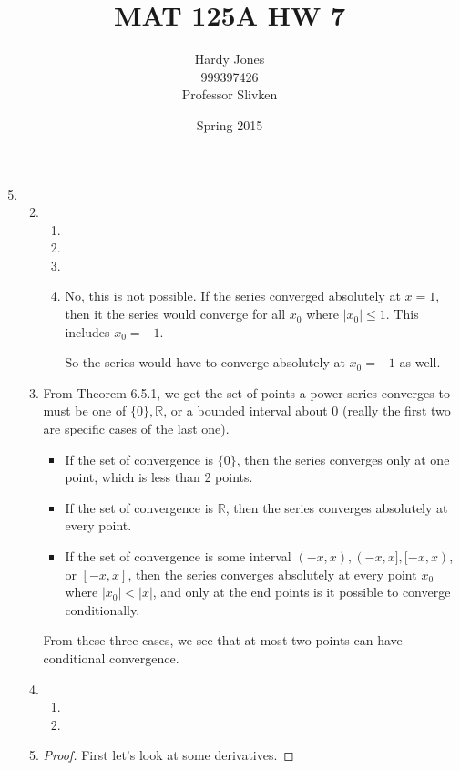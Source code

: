 \documentclass[12pt,letterpaper]{article}
\title{MAT 125A HW 7\vspace{-2ex}}
\author{Hardy Jones\\
        999397426\\
        Professor Slivken\vspace{-2ex}}
\date{Spring 2015}
\begin{document}
  \maketitle

  \begin{enumerate}
    \setcounter{enumi}{4}
    \item
      \begin{enumerate}
        \setcounter{enumii}{1}
        \item
          \begin{enumerate}
            \item
            \item
            \item
            \item
              No, this is not possible.
              If the series converged absolutely at $x = 1$,
              then it the series would converge for all $x_0$ where $|x_0| \leq 1$.
              This includes $x_0 = -1$.

              So the series would have to converge absolutely at $x_0 = -1$ as well.
          \end{enumerate}
        \item
          From Theorem 6.5.1, we get the set of points a power series converges to must be one of $\{0\}, \mathbb{R}$, or a bounded interval about 0 (really the first two are specific cases of the last one).
          \begin{itemize}
            \item
              If the set of convergence is $\{0\}$, then the series converges only at one point, which is less than 2 points.
            \item
              If the set of convergence is $\mathbb{R}$, then the series converges absolutely at every point.
            \item
              If the set of convergence is some interval $(-x, x), (-x, x], [-x, x)$, or $[-x, x]$, then the series converges absolutely at every point $x_0$ where $|x_0| < |x|$, and only at the end points is it possible to converge conditionally.
          \end{itemize}

          From these three cases, we see that at most two points can have conditional convergence.
        \item
          \begin{enumerate}
            \item
            \item
          \end{enumerate}
        \setcounter{enumii}{8}
        \item
          \begin{proof}
            First let's look at some derivatives.


\end{proof}
\end{enumerate}
\end{enumerate}
\end{document}
